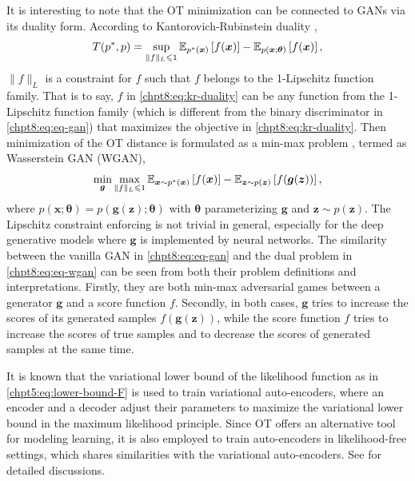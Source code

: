 \begin{remark}\label{chpt8:rmk:wgan}
  It is interesting to note that the OT minimization can be connected to GANs via its duality form. According to Kantorovich-Rubinstein duality \cite[Section~2.4]{2018arXiv180300567P}\cite{villani2008optimal},
  \begin{equation}\label{chpt8:eq:kr-duality}
     T(p^{\ast},p) = \sup_{\|f\|_{L} \leqslant 1} \mathbb{E}_{p^{\ast}(\bm{x})}\left[ f(\bm{x}) \right] -
  \mathbb{E}_{p(\bm{x};\bm{\theta})}\left[ f(\bm{x}) \right],
\end{equation}
$\|f\|_L$ is a constraint for $f$ such that $f$ belongs to the 1-Lipschitz function
family. That is to say, $f$ in \eqref{chpt8:eq:kr-duality} can be any function from the 1-Lipschitz function
family (which is different from the binary discriminator in \eqref{chpt8:eq:eq-gan}) that maximizes the objective in \eqref{chpt8:eq:kr-duality}. Then minimization of the OT distance is formulated as a min-max problem \cite{2017arXiv170107875A}, termed as Wasserstein GAN (WGAN),
\begin{equation}\label{chpt8:eq:eq-wgan}
  \min_{\bm{g}} \max_{\|f\|_{L} \leqslant 1} \mathbb{E}_{\bm{x} \sim p^{\ast}(\bm{x})}\left[ f(\bm{x}) \right] -
  \mathbb{E}_{\bm{z}\sim p(\bm{z})}\left[ f(\bm{g}(\bm{z})) \right],
\end{equation}
where $p(\bm{x};\bm{\theta}) = p(\bm{g}(\bm{z}); \bm{\theta})$ with $\bm{\theta}$ parameterizing $\bm{g}$ and $\bm{z}\sim p(\bm{z})$. The Lipschitz constraint enforcing is not trivial in general, especially for the deep generative models where $\bm{g}$ is implemented by neural networks.
The similarity between the vanilla GAN in \eqref{chpt8:eq:eq-gan} and the dual problem in \eqref{chpt8:eq:eq-wgan} can be seen from both their problem definitions and interpretations. Firstly, they are both min-max adversarial games between a generator $\bm{g}$ and a score function $f$. Secondly, in both cases, $\bm{g}$ tries to increase the scores of its generated samples $f(\bm{g}(\bm{z}))$, while the score function $f$ tries to increase the scores of true samples and to decrease the scores of generated samples at the same time.
\end{remark}

\begin{remark}
It is known that the variational lower bound of the likelihood function as in \eqref{chpt5:eq:lower-bound-F} is used to train variational auto-encoders, where an encoder and a decoder adjust their parameters to maximize the variational lower bound in the maximum likelihood principle. Since OT offers an alternative tool for modeling learning, it is also employed to train auto-encoders in likelihood-free settings, which shares similarities with the variational auto-encoders. See \cite{patrini2018sinkhornVAE, genevay2017gan,bousquet2017optimal, ambrogioni2018wasserstein} for detailed discussions.
\end{remark}

